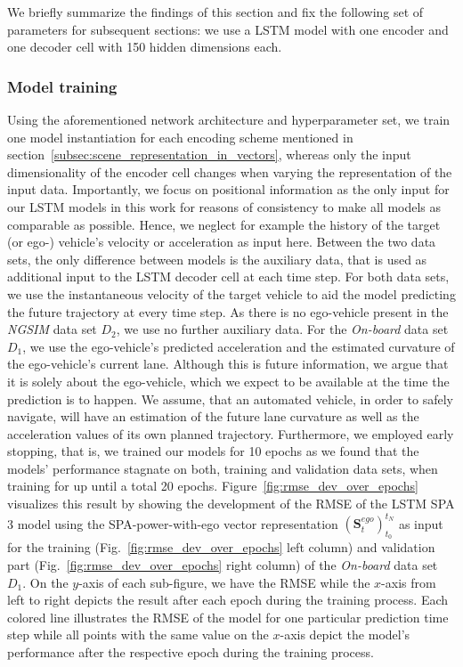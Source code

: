 We briefly summarize the findings of this section and fix the following set of parameters for subsequent sections: we use a \ac{LSTM} model with one encoder and one decoder cell with \num{150} hidden dimensions each.

\subsubsection{Model training}%
\label{ssubsec:model_training_lstms}

Using the aforementioned network architecture and hyperparameter set, we train one model instantiation for each encoding scheme mentioned in section~\ref{subsec:scene_representation_in_vectors}, whereas only the input dimensionality of the encoder cell changes when varying the representation of the input data.
Importantly, we focus on positional information as the only input for our \ac{LSTM} models in this work for reasons of consistency to make all models as comparable as possible.
Hence, we neglect for example the history of the target (or ego-) vehicle's velocity or acceleration as input here.
Between the two data sets, the only difference between models is the auxiliary data, that is used as additional input to the \ac{LSTM} decoder cell at each time step.
For both data sets, we use the instantaneous velocity of the target vehicle to aid the model predicting the future trajectory at every time step.
As there is no ego-vehicle present in the \emph{\ac{NGSIM}} data set $D_2$, we use no further auxiliary data.
For the \emph{On-board} data set $D_1$, we use the ego-vehicle's predicted acceleration and the estimated curvature of the ego-vehicle's current lane.
Although this is future information, we argue that it is solely about the ego-vehicle, which we expect to be available at the time the prediction is to happen.
We assume, that an automated vehicle, in order to safely navigate, will have an estimation of the future lane curvature as well as the acceleration values of its own planned trajectory.
Furthermore, we employed early stopping, that is, we trained our models for \num{10} epochs as we found that the models' performance stagnate on both, training and validation data sets, when training for up until a total \num{20} epochs.
Figure~\ref{fig:rmse_dev_over_epochs} visualizes this result by showing the development of the \ac{RMSE} of the \ac{LSTM} \acs{SPA} \num{3} model using the \ac{SPA}-power-with-ego vector representation $(\mathbf{S}_{t}^{ego})_{t_0}^{t_N}$ as input for the training (Fig.~\ref{fig:rmse_dev_over_epochs} left column) and validation part (Fig.~\ref{fig:rmse_dev_over_epochs} right column) of the \emph{On-board} data set $D_1$.
On the $y$-axis of each sub-figure, we have the \ac{RMSE} while the $x$-axis from left to right depicts the result after each epoch during the training process.
Each colored line illustrates the \ac{RMSE} of the model for one particular prediction time step while all points with the same value on the $x$-axis depict the model's performance after the respective epoch during the training process.

